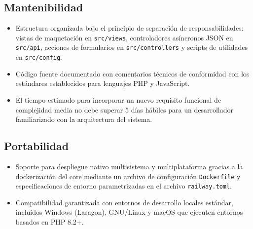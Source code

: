 \documentclass[11pt,a4paper]{report}
\begin{document}
\subsection{Mantenibilidad}
\begin{itemize}
    \item Estructura organizada bajo el principio de separación de responsabilidades: vistas de maquetación en \texttt{src/views}, controladores asíncronos JSON en \texttt{src/api}, acciones de formularios en \texttt{src/controllers} y scripts de utilidades en \texttt{src/config}.
    \item Código fuente documentado con comentarios técnicos de conformidad con los estándares establecidos para lenguajes PHP y JavaScript.
    \item El tiempo estimado para incorporar un nuevo requisito funcional de complejidad media no debe superar 5 días hábiles para un desarrollador familiarizado con la arquitectura del sistema.
\end{itemize}

\subsection{Portabilidad}
\begin{itemize}
    \item Soporte para despliegue nativo multisistema y multiplataforma gracias a la dockerización del core mediante un archivo de configuración \texttt{Dockerfile} y especificaciones de entorno parametrizadas en el archivo \texttt{railway.toml}.
    \item Compatibilidad garantizada con entornos de desarrollo locales estándar, incluidos Windows (Laragon), GNU/Linux y macOS que ejecuten entornos basados en PHP 8.2+.
\end{itemize}
\end{document}
